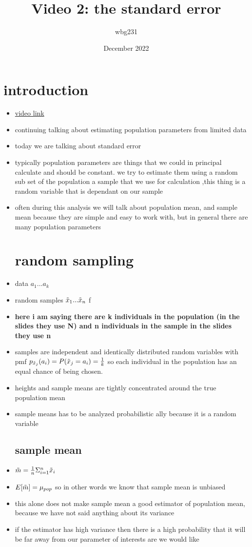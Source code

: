 \documentclass{article}
\title{Video 2: the standard error}
\author{wbg231 }
\date{December 2022}
\begin{document}
\maketitle

\section{introduction}
\begin{itemize}
\item \href{https://www.youtube.com/watch?v=wzWrZ40ZPoU&list=PLBEf5mJtE6KuZ5NBQMuWIMsiOOrV9ibzm&index=67}{video link}
\item continuing talking about estimating population parameters from limited data
\item today we are talking about standard error
\item typically population parameters are things that we could in principal calculate and should be constant. 
\itme we try to estimate them using a random sub set of the population a sample that we use for calculation ,this thing is a random variable that is dependant on our sample
\item often during this analysis we will talk about population mean, and sample mean because they are simple and easy to work with, but in general there are many population parameters
\section{random sampling }
\item data $a_1...a_k$
\item random samples $\Tilde{x}_1...\Tilde{x}_n$ f
\item \textbf{here i am saying there are k individuals in the population (in the slides they use N) and n individuals in the sample in the slides they use n}
\item samples are independent and identically distributed random variables with pmf $p_{\Tilde{x}_{j}}(a_i)=P(\Tilde{x}_{j}=a_i)=\frac{1}{k}$ so each individual in the population has an equal chance of being chosen. 
\item heights and sample means are tightly concentrated around the true population mean 
\item sample means has to be analyzed probabilistic ally because it is a random variable 
\subsection{sample mean }
\item $\Tilde{m}=\frac{1}{n}\Sigma_{i=1}^{n}\Tilde{x}_i$
\item $E[\Tilde{m}]=\mu_{pop}$ so in other words we know that sample mean is unbiased 
\item this alone does not make sample mean a good estimator of population mean, because we have not said anything about its variance 
\item if the estimator has high variance then there is a high probability that it will be far away from our parameter of interests are we would like 

\end{itemize}
\end{document}
